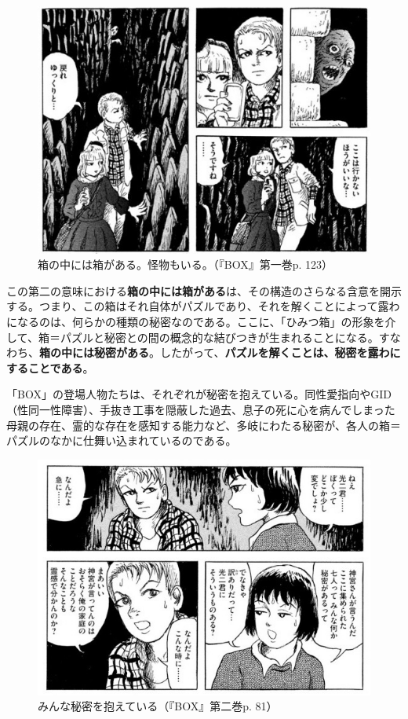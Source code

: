\documentclass[a4paper]{jsarticle}
\begin{document}
\begin{figure}[h]
\centering
\includegraphics[scale=0.7]{箱と怪物}
\caption{箱の中には箱がある。怪物もいる。（『BOX』第一巻p. 123）}
\end{figure}

この第二の意味における\textbf{箱の中には箱がある}は、その構造のさらなる含意を開示する。つまり、この箱はそれ自体がパズルであり、それを解くことによって露わになるのは、何らかの種類の秘密なのである。ここに、「ひみつ箱」の形象を介して、箱＝パズルと秘密との間の概念的な結びつきが生まれることになる。すなわち、\textbf{箱の中には秘密がある}。したがって、\textbf{パズルを解くことは、秘密を露わにすることである}。

「BOX」の登場人物たちは、それぞれが秘密を抱えている。同性愛指向やGID（性同一性障害）、手抜き工事を隠蔽した過去、息子の死に心を病んでしまった母親の存在、霊的な存在を感知する能力など、多岐にわたる秘密が、各人の箱＝パズルのなかに仕舞い込まれているのである。

\begin{figure}[h]
\centering
\includegraphics[scale=0.7]{秘密}
\caption{みんな秘密を抱えている（『BOX』第二巻p. 81）}
\end{figure}
\end{document}
